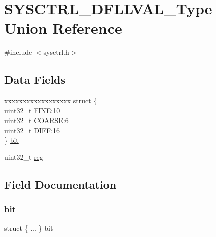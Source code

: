 \hypertarget{union_s_y_s_c_t_r_l___d_f_l_l_v_a_l___type}{}\section{S\+Y\+S\+C\+T\+R\+L\+\_\+\+D\+F\+L\+L\+V\+A\+L\+\_\+\+Type Union Reference}
\label{union_s_y_s_c_t_r_l___d_f_l_l_v_a_l___type}


{\ttfamily \#include $<$sysctrl.\+h$>$}

\subsection*{Data Fields}
\begin{DoxyCompactItemize}
\item 
\begin{tabbing}
xx\=xx\=xx\=xx\=xx\=xx\=xx\=xx\=xx\=\kill
struct \{\\
\>uint32\_t \mbox{\hyperlink{union_s_y_s_c_t_r_l___d_f_l_l_v_a_l___type_a9ead7045e9abb8994d99b2be8e4aae27}{FINE}}:10\\
\>uint32\_t \mbox{\hyperlink{union_s_y_s_c_t_r_l___d_f_l_l_v_a_l___type_a0e15a0b79112e107d20f1534dab23427}{COARSE}}:6\\
\>uint32\_t \mbox{\hyperlink{union_s_y_s_c_t_r_l___d_f_l_l_v_a_l___type_ab78acedd49dbc152b1e08f615fafc97b}{DIFF}}:16\\
\} \mbox{\hyperlink{union_s_y_s_c_t_r_l___d_f_l_l_v_a_l___type_a54aed467671a2f7859de6bfc11f74372}{bit}}\\

\end{tabbing}\item 
uint32\+\_\+t \mbox{\hyperlink{union_s_y_s_c_t_r_l___d_f_l_l_v_a_l___type_a6b91636401516a477989a336376d7b40}{reg}}
\end{DoxyCompactItemize}


\subsection{Field Documentation}
\mbox{\label{union_s_y_s_c_t_r_l___d_f_l_l_v_a_l___type_a54aed467671a2f7859de6bfc11f74372}} 
\subsubsection{\texorpdfstring{bit}{bit}}
{\footnotesize\ttfamily struct \{ ... \}   bit}

